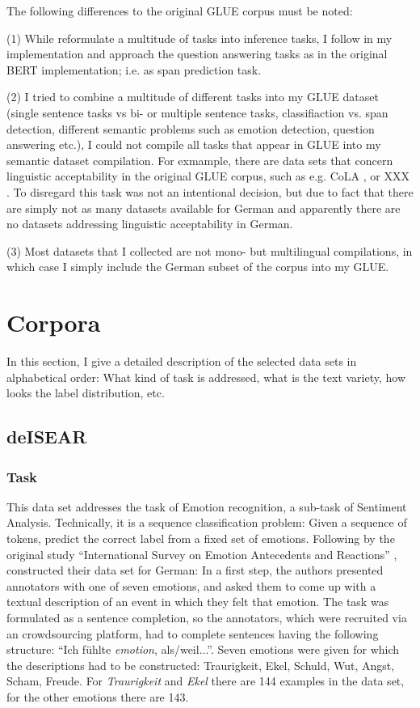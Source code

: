 The following differences to the original GLUE corpus must be noted:

(1) While \cite{wang2018glue} reformulate a multitude of tasks into inference tasks, I follow in my implementation \cite{zhang2019semantics} and approach the question answering tasks as \cite{devlin2018bert} in the original BERT implementation; i.e. as span prediction task.

(2) I tried to combine a multitude of different tasks into my GLUE dataset (single sentence tasks vs bi- or multiple sentence tasks, classifiaction vs. span detection, different semantic problems such as emotion detection, question answering etc.), I could not compile all tasks that appear in GLUE into my semantic dataset compilation.
For exmample, there are data sets that concern linguistic acceptability in the original GLUE corpus, such as  e.g. CoLA \cite{warstadt2019neural}, or XXX .
To disregard this task was not an intentional decision, but due to fact that there are simply not as many datasets available for German and apparently there are no datasets addressing linguistic acceptability in German.

(3) Most datasets that I collected are not mono- but multilingual compilations, in which case I simply include the German subset of the corpus into my GLUE.

\section{Corpora}

In this section, I give a detailed description of the selected data sets in alphabetical order:
What kind of task is addressed, what is the text variety, how looks the label distribution, etc.

\subsection{deISEAR}

\subsubsection{Task}

This data set addresses the task of Emotion recognition, a sub-task of Sentiment Analysis.
Technically, it is a sequence classification problem: Given a sequence of tokens, predict the correct label from a fixed set of emotions.
Following by the original study ``International Survey on Emotion Antecedents and Reactions'' \citep{scherer1994evidence}, \cite{troiano2019crowdsourcing} constructed their data set for German:
In a first step, the authors presented annotators with one of seven emotions, and asked them to come up with a textual description of an event in which they felt that emotion.
The task was formulated as a sentence completion, so the annotators, which were recruited via an crowdsourcing platform, had to complete sentences having the following structure: ``Ich fühlte \emph{emotion}, als/weil...''.
Seven emotions were given for which the descriptions had to be constructed:
Traurigkeit, Ekel, Schuld, Wut, Angst, Scham, Freude.
For \emph{Traurigkeit} and \emph{Ekel} there are 144 examples in the data set, for the other emotions there are 143.

